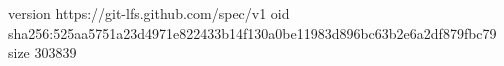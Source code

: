 version https://git-lfs.github.com/spec/v1
oid sha256:525aa5751a23d4971e822433b14f130a0be11983d896bc63b2e6a2df879fbc79
size 303839
